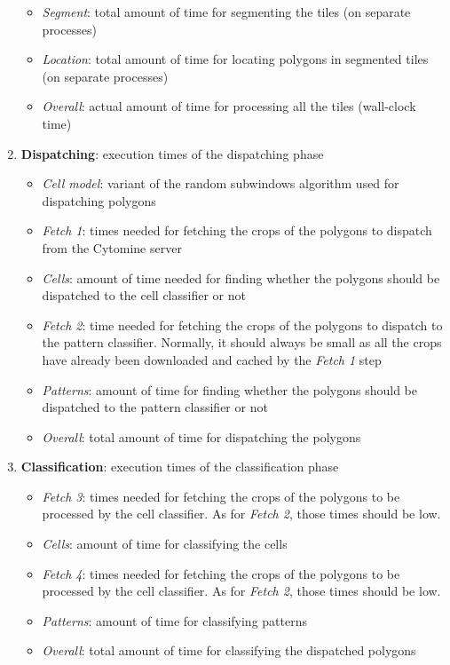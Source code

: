 \begin{enumerate}
\begin{itemize}
		\item \textit{Segment}: total amount of time for segmenting the tiles (on separate processes)
		\item \textit{Location}: total amount of time for locating polygons in segmented tiles (on separate processes)
		\item \textit{Overall}: actual amount of time for processing all the tiles (wall-clock time)
	\end{itemize}
	\item \textbf{Dispatching}: execution times of the dispatching phase
	\begin{itemize}
		\item \textit{Cell model}: variant of the random subwindows algorithm used for dispatching polygons
		\item \textit{Fetch 1}: times needed for fetching the crops of the polygons to dispatch from the Cytomine server
		\item \textit{Cells}: amount of time needed for finding whether the polygons should be dispatched to the cell classifier or not
		\item \textit{Fetch 2}: time needed for fetching the crops of the polygons to dispatch to the pattern classifier. Normally, it should always be small as all the crops have already been downloaded and cached by the \textit{Fetch 1} step
		\item \textit{Patterns}: amount of time for finding whether the polygons should be dispatched to the pattern classifier or not
		\item \textit{Overall}: total amount of time for dispatching the polygons 
	\end{itemize}
	\item \textbf{Classification}: execution times of the classification phase
	\begin{itemize}
		\item \textit{Fetch 3}: times needed for fetching the crops of the polygons to be processed by the cell classifier. As for \textit{Fetch 2}, those times should be low. 
		\item \textit{Cells}: amount of time for classifying the cells 
		\item \textit{Fetch 4}: times needed for fetching the crops of the polygons to be processed by the cell classifier. As for \textit{Fetch 2}, those times should be low.
		\item \textit{Patterns}: amount of time for classifying patterns
		\item \textit{Overall}: total amount of time for classifying the dispatched polygons

\end{itemize}
\end{enumerate}
